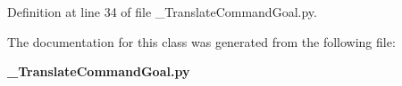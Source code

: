 \subsubsection[{y\-\_\-velocity}]{}\label{classoryx__drive__controller_1_1msg_1_1__TranslateCommandGoal_1_1TranslateCommandGoal_a397fb1b7bcf415240d4270b74b10353a}


\-Definition at line 34 of file \-\_\-\-Translate\-Command\-Goal.\-py.



\-The documentation for this class was generated from the following file\-:\begin{DoxyCompactItemize}
\item 
{\bf \-\_\-\-Translate\-Command\-Goal.\-py}\end{DoxyCompactItemize}
